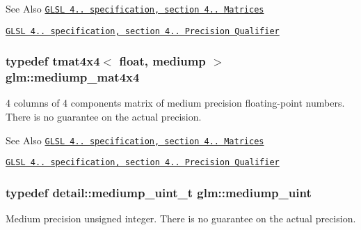 \begin{DoxySeeAlso}{See Also}
\href{http://www.opengl.org/registry/doc/GLSLangSpec.4.20.8.pdf}{\tt G\-L\-S\-L 4.. specification, section 4.. Matrices} 

\href{http://www.opengl.org/registry/doc/GLSLangSpec.4.20.8.pdf}{\tt G\-L\-S\-L 4.. specification, section 4.. Precision Qualifier} 
\end{DoxySeeAlso}
\hypertarget{group__core__precision_gaad45864262bb2cf923667fde779a0058}{
\subsubsection[{mediump\-\_\-mat4x4}]{\setlength{\rightskip}{0pt plus 5cm}typedef tmat4x4$<$ float, mediump $>$ {\bf glm\-::mediump\-\_\-mat4x4}}}\label{group__core__precision_gaad45864262bb2cf923667fde779a0058}
4 columns of 4 components matrix of medium precision floating-\/point numbers. There is no guarantee on the actual precision.

\begin{DoxySeeAlso}{See Also}
\href{http://www.opengl.org/registry/doc/GLSLangSpec.4.20.8.pdf}{\tt G\-L\-S\-L 4.. specification, section 4.. Matrices} 

\href{http://www.opengl.org/registry/doc/GLSLangSpec.4.20.8.pdf}{\tt G\-L\-S\-L 4.. specification, section 4.. Precision Qualifier} 
\end{DoxySeeAlso}
\hypertarget{group__core__precision_ga08ae38ad78ade3539fdd1d25052b8c51}{
\subsubsection[{mediump\-\_\-uint}]{\setlength{\rightskip}{0pt plus 5cm}typedef detail\-::mediump\-\_\-uint\-\_\-t {\bf glm\-::mediump\-\_\-uint}}}\label{group__core__precision_ga08ae38ad78ade3539fdd1d25052b8c51}
Medium precision unsigned integer. There is no guarantee on the actual precision.

